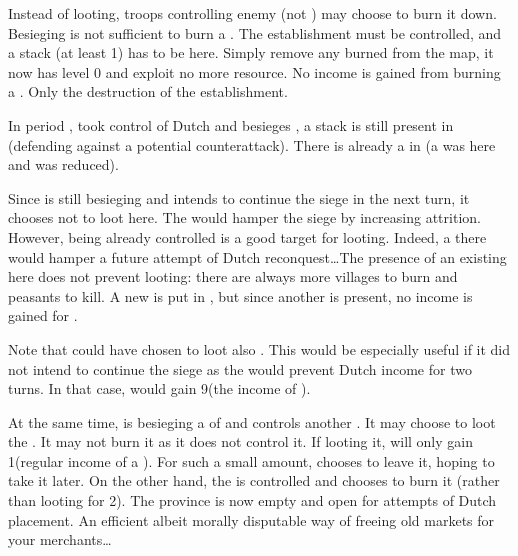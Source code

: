 \aparag[Burning \TP]
\bparag Instead of looting, troops controlling enemy \TP (not \COL) may choose
to burn it down.
\bparag Besieging is not sufficient to burn a \TP. The establishment must be
controlled, and a stack (at least 1\LDE) has to be here.
\bparag Simply remove any burned \TP from the map, it now has level 0 and
exploit no more resource.
\bparag No income is gained from burning a \TP. Only the destruction of the
establishment.

\begin{exemple}[Looting]
  In period , \SPA took control of Dutch \provinceUtrecht and
  besieges \provinceZeeland, a stack is still present in \provinceUtrecht
  (defending against a potential counterattack). There is already a
  \PILLAGE\Facemoins in \provinceUtrecht (a \PILLAGE\Faceplus was here and was
  reduced).

  Since \SPA is still besieging \provinceZeeland and intends to continue the
  siege in the next turn, it chooses not to loot here. The \PILLAGE would
  hamper the siege by increasing attrition. However, \provinceUtrecht being
  already controlled is a good target for looting. Indeed, a \PILLAGE there
  would hamper a future attempt of Dutch reconquest\ldots The presence of an
  existing \PILLAGE here does not prevent looting: there are always more
  villages to burn and peasants to kill. A new \PILLAGE\Faceplus is put in
  \provinceUtrecht, but since another \PILLAGE is present, no income is gained
  for \SPA.

  Note that \SPA could have chosen to loot also \provinceZeeland. This would
  be especially useful if it did not intend to continue the siege as the
  \PILLAGE would prevent Dutch income for two turns. In that case, \SPA would
  gain 9\ducats (the income of \provinceZeeland).
\end{exemple}

\begin{exemple}[Burning \TP]
  At the same time, \HOL is besieging a \TP\Facemoins of \paysPortugal and
  controls another \TP\Faceplus. It may choose to loot the \TP\Facemoins. It
  may not burn it as it does not control it. If looting it, \HOL will only
  gain 1\ducats (regular income of a \TP\Facemoins). For such a small amount,
  \HOL chooses to leave it, hoping to take it later. On the other hand, the
  \TP\Faceplus is controlled and \HOL chooses to burn it (rather than looting
  for 2\ducats). The province is now empty and open for attempts of Dutch \TP
  placement. An efficient albeit morally disputable way of freeing old markets
  for your merchants\ldots
\end{exemple}

